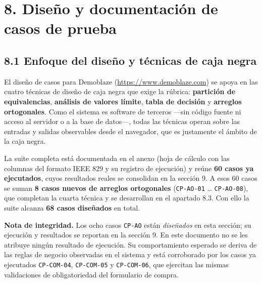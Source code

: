 \FloatBarrier
\section*{8. Diseño y documentación de casos de prueba}

\subsection*{8.1 Enfoque del diseño y técnicas de caja negra}

El diseño de casos para Demoblaze (\url{https://www.demoblaze.com}) se apoya en las
cuatro técnicas de diseño de caja negra que exige la rúbrica: \textbf{partición de
equivalencias}, \textbf{análisis de valores límite}, \textbf{tabla de decisión} y
\textbf{arreglos ortogonales}. Como el sistema es software de terceros —sin código
fuente ni acceso al servidor o a la base de datos—, todas las técnicas operan sobre
las entradas y salidas observables desde el navegador, que es justamente el ámbito de
la caja negra.

La suite completa está documentada en el anexo (hoja de cálculo con las columnas del
formato IEEE 829 y su registro de ejecución) y reúne \textbf{60 casos ya ejecutados},
cuyos resultados reales se consolidan en la sección 9. A esos 60 casos se suman
\textbf{8 casos nuevos de arreglos ortogonales} (\texttt{CP-AO-01} \dots{}
\texttt{CP-AO-08}), que completan la cuarta técnica y se desarrollan en el apartado
8.3. Con ello la suite alcanza \textbf{68 casos diseñados} en total.

\medskip
\noindent\textbf{Nota de integridad.} Los ocho casos \texttt{CP-AO} están
\emph{diseñados} en esta sección; su ejecución y resultados se reportan en la
sección 9. En este documento no se les atribuye ningún resultado de ejecución. Su
comportamiento esperado se deriva de las reglas de negocio observadas en el sistema y
está corroborado por los casos ya ejecutados \texttt{CP-COM-04}, \texttt{CP-COM-05} y
\texttt{CP-COM-06}, que ejercitan las mismas validaciones de obligatoriedad del
formulario de compra.

